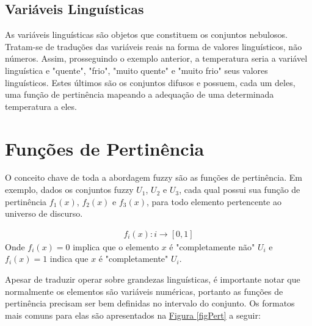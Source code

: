 \subsection{Variáveis Linguísticas}
As variáveis linguísticas são objetos que constituem os conjuntos nebulosos. Tratam-se de traduções das variáveis reais na forma de valores linguísticos, não números. Assim, prosseguindo o exemplo anterior, a temperatura seria a variável linguística e "quente", "frio", "muito quente" e "muito frio" seus valores linguísticos. Estes últimos são os conjuntos difusos e possuem, cada um deles, uma função de pertinência mapeando a adequação de uma determinada temperatura a eles.

\section{Funções de Pertinência}
\label{secFncPert}
O conceito chave de toda a abordagem fuzzy são as funções de pertinência. Em exemplo, dados os conjuntos fuzzy $U_1$, $U_2$ e $U_3$, cada qual possui sua função de pertinência $f_1(x)$, $f_2(x)$ e $f_3(x)$, para todo elemento pertencente ao universo de discurso.

\begin{align}
	f_i(x) : i \rightarrow [0,1]
	\label{eqFuncPertFuzzy}
\end{align}
Onde $f_i(x)=0$ implica que o elemento $x$ é "completamente não" $U_i$ e $f_i(x)=1$ indica que $x$ é "completamente" $U_i$.

Apesar de traduzir operar sobre grandezas linguísticas, é importante notar que normalmente os elementos são variáveis numéricas, portanto as funções de pertinência precisam ser bem definidas no intervalo do conjunto. Os formatos mais comuns para elas são apresentados na \hyperref[figPert]{Figura \ref{figPert}} a seguir:

